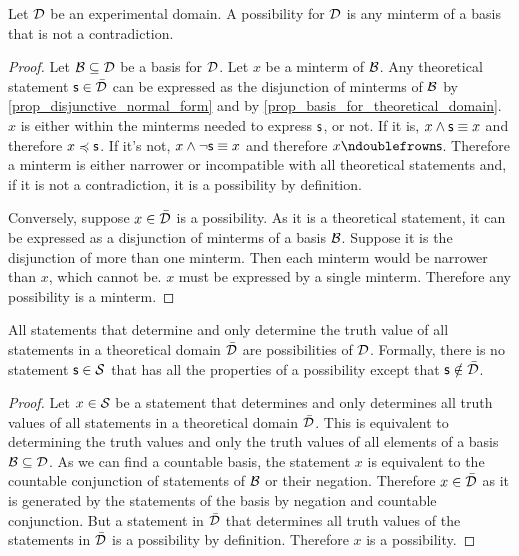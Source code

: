 \documentclass[11pt,letterpaper,fleqn]{memoir} %
\begin{document}
\begin{mathSection}
	
\begin{prop}\label{prop_poss_is_minterm}
	Let $\mathcal{D}$ be an experimental domain. A possibility for $\mathcal{D}$ is any minterm of a basis that is not a contradiction.
\end{prop}

\begin{proof}
	Let $\mathcal{B} \subseteq \mathcal{D}$ be a basis for $\mathcal{D}$. Let $x$ be a minterm of $\mathcal{B}$. Any theoretical statement $\mathsf{s} \in \bar{\mathcal{D}}$ can be expressed as the disjunction of minterms of $\mathcal{B}$ by \ref{prop_disjunctive_normal_form} and by \ref{prop_basis_for_theoretical_domain}. $x$ is either within the minterms needed to express $\mathsf{s}$, or not. If it is, $x \wedge \mathsf{s} \equiv x$ and therefore $x \preccurlyeq \mathsf{s}$. If it's not, $x \wedge \neg \mathsf{s} \equiv x$ and therefore $x \ncomp \stmt$. Therefore a minterm is either narrower or incompatible with all theoretical statements and, if it is not a contradiction, it is a possibility by definition.
	
	Conversely, suppose $x \in \bar{\mathcal{D}}$ is a possibility. As it is a theoretical statement, it can be expressed as a disjunction of minterms of a basis $\mathcal{B}$. Suppose it is the disjunction of more than one minterm. Then each minterm would be narrower than $x$, which cannot be. $x$ must be expressed by a single minterm. Therefore any possibility is a minterm.
\end{proof}

\begin{prop}
	All statements that determine and only determine the truth value of all statements in a theoretical domain $\bar{\mathcal{D}}$ are possibilities of $\mathcal{D}$. Formally, there is no statement $\mathsf{s} \in \mathcal{S}$ that has all the properties of a possibility except that $\mathsf{s} \notin \bar{\mathcal{D}}$.
\end{prop}

\begin{proof}
	Let $x \in \mathcal{S}$ be a statement that determines and only determines all truth values of all statements in a theoretical domain $\bar{\mathcal{D}}$. This is equivalent to determining the truth values and only the truth values of all elements of a basis $\mathcal{B} \subseteq \mathcal{D}$. As we can find a countable basis, the statement $x$ is equivalent to the countable conjunction of statements of $\mathcal{B}$ or their negation. Therefore $x \in \bar{\mathcal{D}}$ as it is generated by the statements of the basis by negation and countable conjunction. But a statement in $\bar{\mathcal{D}}$ that determines all truth values of the statements in $\bar{\mathcal{D}}$ is a possibility by definition. Therefore $x$ is a possibility.
\end{proof}
\end{mathSection}
\end{document}

